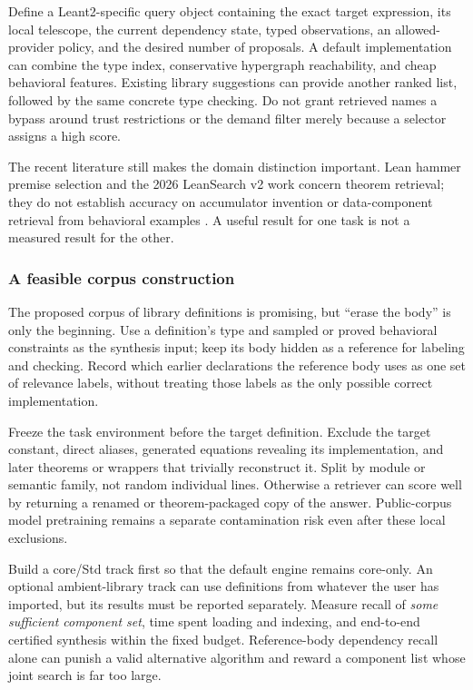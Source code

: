 \documentclass[11pt,a4paper]{article}
\theoremstyle{definition}
\theoremstyle{remark}
\begin{document}
Define a Leant2-specific query object containing the exact target expression,
its local telescope, the current dependency state, typed observations, an
allowed-provider policy, and the desired number of proposals. A default
implementation can combine the type index, conservative hypergraph reachability,
and cheap behavioral features. Existing library suggestions can provide another
ranked list, followed by the same concrete type checking. Do not grant retrieved
names a bypass around trust restrictions or the demand filter merely because
a selector assigns a high score.

The recent literature still makes the domain distinction important. Lean hammer
premise selection and the 2026 LeanSearch v2 work concern theorem retrieval;
they do not establish accuracy on accumulator invention or data-component
retrieval from behavioral examples \cite{hammer,leansearch}. A useful result
for one task is not a measured result for the other.

\subsubsection*{A feasible corpus construction}
The proposed corpus of library definitions is promising, but ``erase the body''
is only the beginning. Use a definition's type and sampled or proved behavioral
constraints as the synthesis input; keep its body hidden as a reference for
labeling and checking. Record which earlier declarations the reference body
uses as one set of relevance labels, without treating those labels as the only
possible correct implementation.

Freeze the task environment before the target definition. Exclude the target
constant, direct aliases, generated equations revealing its implementation,
and later theorems or wrappers that trivially reconstruct it. Split by module
or semantic family, not random individual lines. Otherwise a retriever can
score well by returning a renamed or theorem-packaged copy of the answer.
Public-corpus model pretraining remains a separate contamination risk even
after these local exclusions.

Build a core/Std track first so that the default engine remains core-only.
An optional ambient-library track can use definitions from whatever the user
has imported, but its results must be reported separately. Measure recall of
\emph{some sufficient component set}, time spent loading and indexing, and
end-to-end certified synthesis within the fixed budget. Reference-body dependency
recall alone can punish a valid alternative algorithm and reward a component
list whose joint search is far too large.
\end{document}
